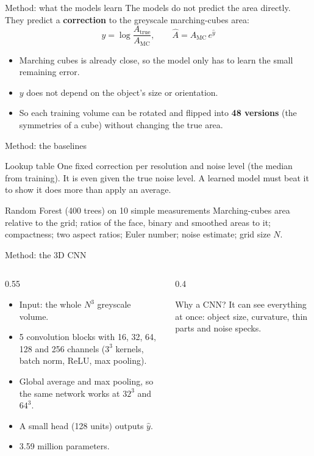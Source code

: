\documentclass[aspectratio=169,11pt]{beamer}
\begin{document}
\begin{frame}{Method: what the models learn}
  The models do not predict the area directly. They predict a \textbf{correction} to the greyscale
  marching-cubes area:
  \[ y = \log \frac{A_\text{true}}{A_\text{MC}}, \qquad \hat A = A_\text{MC}\, e^{\hat y} \]
  \begin{itemize}
    \item Marching cubes is already close, so the model only has to learn the small remaining error.
    \item $y$ does not depend on the object's size or orientation.
    \item So each training volume can be rotated and flipped into \textbf{48 versions} (the
          symmetries of a cube) without changing the true area.
  \end{itemize}
\end{frame}

\begin{frame}{Method: the baselines}
  \begin{block}{Lookup table}
    One fixed correction per resolution and noise level (the median from training). It is even
    given the true noise level. A learned model must beat it to show it does more than apply an
    average.
  \end{block}
  \begin{block}{Random Forest (400 trees) on 10 simple measurements}
    Marching-cubes area relative to the grid; ratios of the face, binary and smoothed areas to it;
    compactness; two aspect ratios; Euler number; noise estimate; grid size $N$.
  \end{block}
\end{frame}

\begin{frame}{Method: the 3D CNN}
  \begin{columns}[T]
    \begin{column}{0.55\textwidth}
      \begin{itemize}
        \item Input: the whole $N^3$ greyscale volume.
        \item 5 convolution blocks with 16, 32, 64, 128 and 256 channels ($3^3$ kernels, batch
              norm, ReLU, max pooling).
        \item Global average and max pooling, so the same network works at $32^3$ and $64^3$.
        \item A small head (128 units) outputs $\hat y$.
        \item 3.59 million parameters.
      \end{itemize}
    \end{column}
    \begin{column}{0.4\textwidth}
      \begin{block}{Why a CNN?}
        It can see everything at once: object size, curvature, thin parts and noise specks.
      \end{block}
    \end{column}
  \end{columns}
\end{frame}
\end{document}
